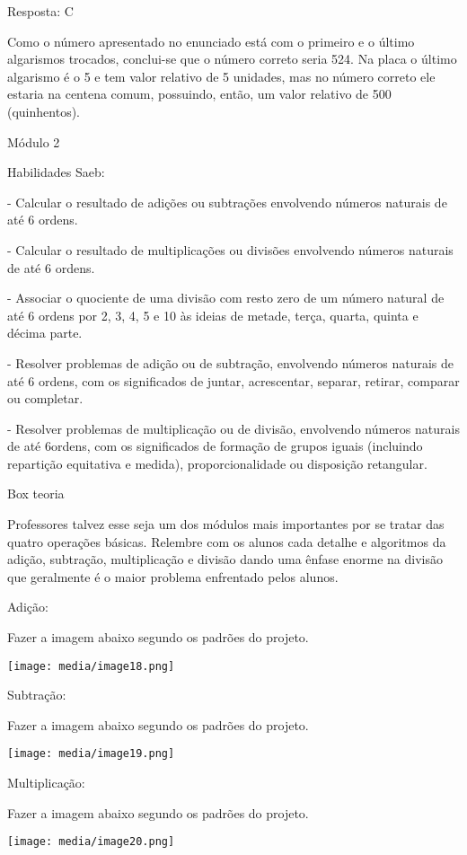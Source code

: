 Resposta: C

Como o número apresentado no enunciado está com o primeiro e o último
algarismos trocados, conclui-se que o número correto seria 524. Na placa
o último algarismo é o 5 e tem valor relativo de 5 unidades, mas no
número correto ele estaria na centena comum, possuindo, então, um valor
relativo de 500 (quinhentos).

Módulo 2

Habilidades Saeb:

- Calcular o resultado de adições ou subtrações envolvendo números
naturais de até 6 ordens.

- Calcular o resultado de multiplicações ou divisões envolvendo números
naturais de até 6 ordens.

- Associar o quociente de uma divisão com resto zero de um número
natural de até 6 ordens por 2, 3, 4, 5 e 10 às ideias de metade, terça,
quarta, quinta e décima parte.

- Resolver problemas de adição ou de subtração, envolvendo números
naturais de até 6 ordens, com os significados de juntar, acrescentar,
separar, retirar, comparar ou completar.

- Resolver problemas de multiplicação ou de divisão, envolvendo números
naturais de até 6ordens, com os significados de formação de grupos
iguais (incluindo repartição equitativa e medida), proporcionalidade ou
disposição retangular.

Box teoria

Professores talvez esse seja um dos módulos mais importantes por se
tratar das quatro operações básicas. Relembre com os alunos cada detalhe
e algoritmos da adição, subtração, multiplicação e divisão dando uma
ênfase enorme na divisão que geralmente é o maior problema enfrentado
pelos alunos.

Adição:

Fazer a imagem abaixo segundo os padrões do projeto.

\texttt{[image: media/image18.png]}

Subtração:

Fazer a imagem abaixo segundo os padrões do projeto.

\texttt{[image: media/image19.png]}

Multiplicação:

Fazer a imagem abaixo segundo os padrões do projeto.

\texttt{[image: media/image20.png]}

